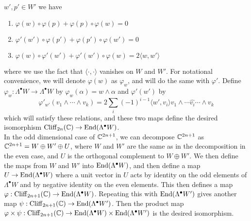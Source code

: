 $w',p' \in W'$ we have
%
\begin{enumerate}
  \item $\varphi(w) \circ \varphi(p) + \varphi(p) \circ \varphi(w) = 0$
  \item $\varphi'(w') \circ \varphi(p') + \varphi(p') \circ \varphi(w') = 0$
  \item $\varphi(w) \circ \varphi'(w') + \varphi'(w') \circ \varphi(w) =
  2\langle w,w' \rangle$
\end{enumerate}
where we use the fact that $\langle \cdot,\cdot \rangle$ vanishes on $W$ and
$W'$. For notational convenience, we will denote $\varphi(w)$ as $\varphi_w$, and
will do the same with $\varphi'$. Define
$\varphi_w : \Lambda^\bullet W \to \Lambda^\bullet W$ by
$\varphi_w(\alpha) = w \wedge \alpha$ and $\varphi'(w')$ by
\[
\varphi'_{w'}(v_1 \wedge \cdots \wedge v_k) = 2\sum_i(-1)^{i-1}\langle w',v_i\rangle
v_1 \wedge \cdots \widehat{v_i} \cdots \wedge v_k
\]
which will satisfy these relations, and these two maps define the desired
isomorphism $\operatorname{Cliff}_{2n}(\mathbb{C}) \to \operatorname{End}(\Lambda^\bullet W)$. \\

In the odd dimensional case of $\mathbb{C}^{2n + 1}$, we can decompose $\mathbb{C}^{2n + 1}$ as
$\mathbb{C}^{2n + 1} = W \oplus W' \oplus U$, where $W$ and $W'$ are the same as in the
decomposition in the even case, and $U$ is the orthogonal complement to
$W \oplus W'$. We then define the maps from $W$ and $W'$ into
$\operatorname{End}(\Lambda^\bullet W)$, and then define a map $U \to \operatorname{End}(\Lambda^\bullet W)$
where a unit vector in $U$ acts by identity on the odd elements of $\Lambda^\bullet W$
and by negative identity on the even elements. This then defines a map
$\varphi : \operatorname{Cliff}_{2n + 1}(\mathbb{C}) \to \operatorname{End}(\Lambda^\bullet W)$. Repeating this with
$\operatorname{End}(\Lambda^\bullet W')$ gives another map
$\psi : \operatorname{Cliff}_{2n+1}(\mathbb{C}) \to \operatorname{End}(\Lambda^\bullet W')$. Then the product map
$\varphi \times \psi : \operatorname{Cliff}_{2n+1}(\mathbb{C}) \to \operatorname{End}(\Lambda^\bullet W) \times
\operatorname{End}(\Lambda^\bullet W')$ is the desired isomorphism. \\




\iffalse
We then claim that these two maps satisfy the relations specified above. From
the skew symmetry of the wedge product,
$\varphi(w) \circ \varphi(p) + \varphi(p) \circ \varphi(w) = 0$. For
the second relation, we compute
%
\begin{align*}
&\varphi'(w') \circ \varphi(p')  =
2\sum_i (-1)^{i-1} \langle p',v_i\rangle\varphi'_{w'}(v_1 \wedge \cdots
\widehat{v_i} \cdots \wedge v_k) \\
= 2 \sum_i (-1)^{i-1} \langle p',v_i \rangle &\left( \left(2\sum_{j < i}(-1)^{j-1}
\langle w',v_j\rangle v_1 \wedge \cdots \widehat{v_j} \cdots \widehat{v_i}
\cdots \wedge v_k \right) + \left( 2\sum_{j > i} (-1)^{j} \langle w',v_j\rangle
v_1 \wedge \cdots \widehat{v_i} \cdots \widehat{v_j} \cdots \wedge v_k\right)\right)
\end{align*}
%
computing $\varphi'(p') \circ \varphi'(w')$ then gives a similar result,
with the roles of $p'$ and $w'$ reversed, which gives the same result with a
reversed sign.
\fi
